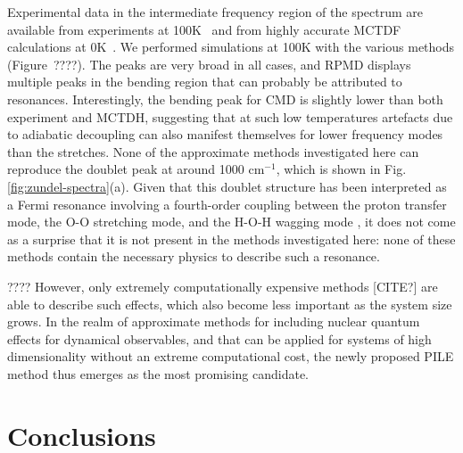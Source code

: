 \documentclass[aps,prb,superscriptaddress,amsmath,amssymb,showpacs,twocolumn]{revtex4}
\begin{document}
Experimental data in the intermediate frequency region of the spectrum are available
from experiments at 100K~\cite{AsmisScience2003} and from highly accurate MCTDF calculations
at 0K~\cite{VendrellMeyer2007}. We performed simulations at 100K with the various methods
(Figure~????). The peaks are very broad in all cases, and RPMD 
displays multiple peaks in the bending region that can probably be attributed to resonances.
Interestingly, the bending peak for CMD is slightly lower than both experiment and MCTDH,
suggesting that at such low temperatures artefacts due to adiabatic decoupling can also manifest 
themselves for lower frequency modes than the stretches. 
None of the approximate methods investigated here can reproduce the
doublet peak at around 1000 cm$^{-1}$, which is shown in Fig. \ref{fig:zundel-spectra}(a).
Given that this doublet structure has been interpreted as a Fermi resonance
involving a fourth-order coupling between the proton transfer mode,
the O-O stretching mode, and the H-O-H wagging mode \cite{VendrellMeyer2007, Schatteburg2008},
it does not come as a surprise that it is not present in the methods investigated here:
none of these methods contain the necessary physics to describe such a resonance.

????
However, only extremely computationally expensive methods [CITE?] are able to describe
such effects, which also become less important as the system size grows. In the realm
of approximate methods for including nuclear quantum effects for dynamical observables,
and that can be applied for systems of high dimensionality without an extreme
computational cost, the newly proposed PILE method
thus emerges as the most promising candidate. 



\section{Conclusions}









\end{document}
